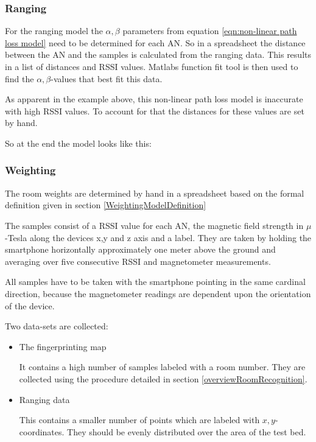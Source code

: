 \subsubsection{Ranging}
For the ranging model the \(\alpha, \beta\) parameters from equation \ref{eqn:non-linear path loss model} need to be determined for each AN. So in a spreadsheet the distance between the AN and the samples is calculated from the ranging data. This results in a list of distances and RSSI values. Matlabs function fit tool is then used to find the \(\alpha, \beta\)-values that best fit this data.

As apparent in the example above, this non-linear path loss model is inaccurate with high RSSI values. To account for that the distances for these values are set by hand.

So at the end the model looks like this:


\subsubsection{Weighting}

The room weights are determined by hand in a spreadsheet based on the formal definition given in section \ref{WeightingModelDefinition}

The samples consist of a RSSI value for each AN, the magnetic field strength in \(\mu\)-Tesla along the devices x,y and z axis and a label. They are taken by holding the smartphone horizontally approximately one meter above the ground and averaging over five 
consecutive RSSI and magnetometer measurements.

All samples have to be taken with the smartphone pointing in the same cardinal direction, because the magnetometer readings are dependent upon the orientation of the device.


Two data-sets are collected:

\begin{itemize}
\item The fingerprinting map

It contains a high number of samples labeled with a room number. They are collected using the procedure detailed in section \ref{overviewRoomRecognition}.

\item Ranging data

This contains a smaller number of points which are labeled with \(x,y\)-coordinates. They should be evenly distributed over the area of the test bed.
\end{itemize}


